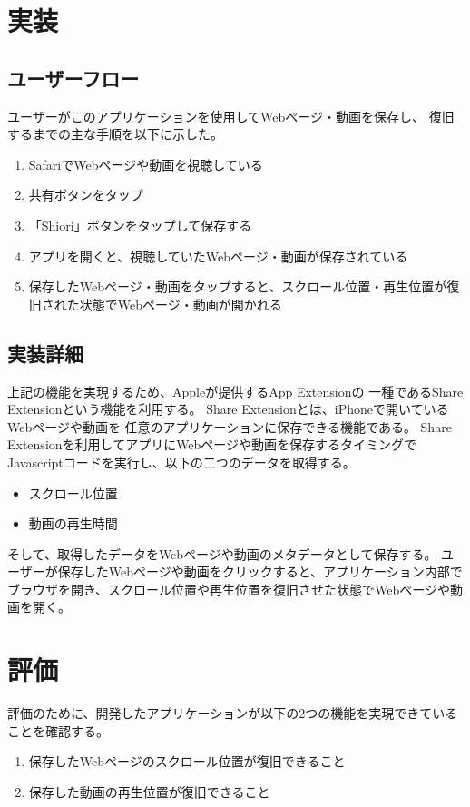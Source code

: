 \documentclass[a4j,10pt]{jsarticle}
\begin{document}
\section{実装}
\subsection{ユーザーフロー}
ユーザーがこのアプリケーションを使用してWebページ・動画を保存し、
復旧するまでの主な手順を以下に示した。
\begin{enumerate}
\item SafariでWebページや動画を視聴している
\item 共有ボタンをタップ
\item 「Shiori」ボタンをタップして保存する
\item アプリを開くと、視聴していたWebページ・動画が保存されている
\item 保存したWebページ・動画をタップすると、スクロール位置・再生位置が復旧された状態でWebページ・動画が開かれる
\end{enumerate}

\subsection{実装詳細}
上記の機能を実現するため、Appleが提供するApp Extension\cite{App-Extension}の
一種であるShare Extension\cite{Share-Extension}という機能を利用する。
Share Extensionとは、iPhoneで開いているWebページや動画を
任意のアプリケーションに保存できる機能である。
Share Extensionを利用してアプリにWebページや動画を保存するタイミングで
Javascriptコードを実行し、以下の二つのデータを取得する。
\begin{itemize}
\item スクロール位置
\item 動画の再生時間
\end{itemize}

そして、取得したデータをWebページや動画のメタデータとして保存する。
ユーザーが保存したWebページや動画をクリックすると、アプリケーション内部で
ブラウザを開き、スクロール位置や再生位置を復旧させた状態でWebページや動画を開く。


\section{評価}
評価のために、開発したアプリケーションが以下の2つの機能を実現できていることを確認する。
\begin{enumerate}
\item 保存したWebページのスクロール位置が復旧できること
\item 保存した動画の再生位置が復旧できること
\end{enumerate}
\end{document}
